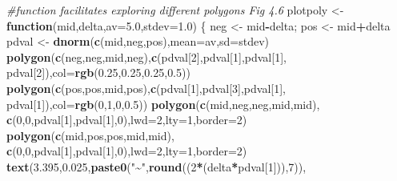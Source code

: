 \documentclass[
  lang=cn,
  11pt,
  scheme=chinese,
  chinesefont=nofont,
  citestyle=gb7714-2015,
  bibstyle=gb7714-2015]{elegantbook}
\newenvironment{Shaded}{\begin{snugshade}}{\end{snugshade}}
\newcommand{\AttributeTok}[1]{\textcolor[rgb]{0.13,0.29,0.53}{#1}}
\newcommand{\CommentTok}[1]{\textcolor[rgb]{0.56,0.35,0.01}{\textit{#1}}}
\newcommand{\ControlFlowTok}[1]{\textcolor[rgb]{0.13,0.29,0.53}{\textbf{#1}}}
\newcommand{\DecValTok}[1]{\textcolor[rgb]{0.00,0.00,0.81}{#1}}
\newcommand{\FloatTok}[1]{\textcolor[rgb]{0.00,0.00,0.81}{#1}}
\newcommand{\FunctionTok}[1]{\textcolor[rgb]{0.13,0.29,0.53}{\textbf{#1}}}
\newcommand{\NormalTok}[1]{#1}
\newcommand{\OtherTok}[1]{\textcolor[rgb]{0.56,0.35,0.01}{#1}}
\newcommand{\SpecialCharTok}[1]{\textcolor[rgb]{0.81,0.36,0.00}{\textbf{#1}}}
\newcommand{\StringTok}[1]{\textcolor[rgb]{0.31,0.60,0.02}{#1}}
\begin{document}
\begin{Shaded}
\begin{Highlighting}[]
 \CommentTok{\#function facilitates exploring different polygons Fig 4.6  }
\NormalTok{plotpoly }\OtherTok{\textless{}{-}} \ControlFlowTok{function}\NormalTok{(mid,delta,}\AttributeTok{av=}\FloatTok{5.0}\NormalTok{,}\AttributeTok{stdev=}\FloatTok{1.0}\NormalTok{) \{  }
\NormalTok{   neg }\OtherTok{\textless{}{-}}\NormalTok{ mid}\SpecialCharTok{{-}}\NormalTok{delta;  pos }\OtherTok{\textless{}{-}}\NormalTok{ mid}\SpecialCharTok{+}\NormalTok{delta  }
\NormalTok{   pdval }\OtherTok{\textless{}{-}} \FunctionTok{dnorm}\NormalTok{(}\FunctionTok{c}\NormalTok{(mid,neg,pos),}\AttributeTok{mean=}\NormalTok{av,}\AttributeTok{sd=}\NormalTok{stdev)  }
   \FunctionTok{polygon}\NormalTok{(}\FunctionTok{c}\NormalTok{(neg,neg,mid,neg),}\FunctionTok{c}\NormalTok{(pdval[}\DecValTok{2}\NormalTok{],pdval[}\DecValTok{1}\NormalTok{],pdval[}\DecValTok{1}\NormalTok{],  }
\NormalTok{                          pdval[}\DecValTok{2}\NormalTok{]),}\AttributeTok{col=}\FunctionTok{rgb}\NormalTok{(}\FloatTok{0.25}\NormalTok{,}\FloatTok{0.25}\NormalTok{,}\FloatTok{0.25}\NormalTok{,}\FloatTok{0.5}\NormalTok{))  }
   \FunctionTok{polygon}\NormalTok{(}\FunctionTok{c}\NormalTok{(pos,pos,mid,pos),}\FunctionTok{c}\NormalTok{(pdval[}\DecValTok{1}\NormalTok{],pdval[}\DecValTok{3}\NormalTok{],pdval[}\DecValTok{1}\NormalTok{],  }
\NormalTok{                                pdval[}\DecValTok{1}\NormalTok{]),}\AttributeTok{col=}\FunctionTok{rgb}\NormalTok{(}\DecValTok{0}\NormalTok{,}\DecValTok{1}\NormalTok{,}\DecValTok{0}\NormalTok{,}\FloatTok{0.5}\NormalTok{))     }
   \FunctionTok{polygon}\NormalTok{(}\FunctionTok{c}\NormalTok{(mid,neg,neg,mid,mid),  }
        \FunctionTok{c}\NormalTok{(}\DecValTok{0}\NormalTok{,}\DecValTok{0}\NormalTok{,pdval[}\DecValTok{1}\NormalTok{],pdval[}\DecValTok{1}\NormalTok{],}\DecValTok{0}\NormalTok{),}\AttributeTok{lwd=}\DecValTok{2}\NormalTok{,}\AttributeTok{lty=}\DecValTok{1}\NormalTok{,}\AttributeTok{border=}\DecValTok{2}\NormalTok{)  }
   \FunctionTok{polygon}\NormalTok{(}\FunctionTok{c}\NormalTok{(mid,pos,pos,mid,mid),  }
        \FunctionTok{c}\NormalTok{(}\DecValTok{0}\NormalTok{,}\DecValTok{0}\NormalTok{,pdval[}\DecValTok{1}\NormalTok{],pdval[}\DecValTok{1}\NormalTok{],}\DecValTok{0}\NormalTok{),}\AttributeTok{lwd=}\DecValTok{2}\NormalTok{,}\AttributeTok{lty=}\DecValTok{1}\NormalTok{,}\AttributeTok{border=}\DecValTok{2}\NormalTok{)   }
   \FunctionTok{text}\NormalTok{(}\FloatTok{3.395}\NormalTok{,}\FloatTok{0.025}\NormalTok{,}\FunctionTok{paste0}\NormalTok{(}\StringTok{"\textasciitilde{}"}\NormalTok{,}\FunctionTok{round}\NormalTok{((}\DecValTok{2}\SpecialCharTok{*}\NormalTok{(delta}\SpecialCharTok{*}\NormalTok{pdval[}\DecValTok{1}\NormalTok{])),}\DecValTok{7}\NormalTok{)),}

\end{Highlighting}
\end{Shaded}
\end{document}
